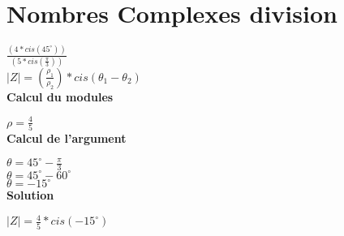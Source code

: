 \newpage
\section{Nombres Complexes division}
\vspace{3mm} %

$\frac{(4 * cis(45^{\circ} ))} {(5 * cis(\frac{\pi}{3}))} $ \\

$|Z| = (\frac{\rho_{1}}{\rho_{2}})* cis(\theta_{1} - \theta_{2})$ \\

\vspace{6mm}
\textbf{Calcul du modules}
\vspace{5mm}

$\rho = \frac{4}{5}$ \\

\vspace{6mm}
\textbf{Calcul de l'argument}
\vspace{5mm}

$\theta = 45^{\circ} - \frac{\pi}{3} $ \\

$\theta = 45^{\circ} - 60^{\circ} $ \\

$\theta = - 15^{\circ} $ \\

\vspace{6mm}
\textbf{Solution}
\vspace{5mm}

$ |Z| = \frac{4}{5} * cis(- 15^{\circ})$ \\
